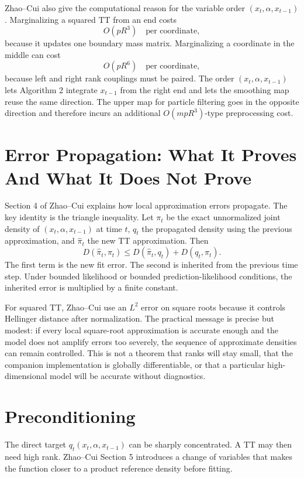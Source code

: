 \documentclass[11pt]{article}
\begin{document}
Zhao--Cui also give the computational reason for the variable order
\((x_t,\alpha,x_{t-1})\).  Marginalizing a squared TT from an end costs
\[
    O(pR^3)\quad\text{per coordinate},
    \tag{B8}
\]
because it updates one boundary mass matrix.  Marginalizing a coordinate in the
middle can cost
\[
    O(pR^6)\quad\text{per coordinate},
    \tag{B9}
\]
because left and right rank couplings must be paired.  The order
\((x_t,\alpha,x_{t-1})\) lets Algorithm 2 integrate \(x_{t-1}\) from the right
end and lets the smoothing map reuse the same direction.  The upper map for
particle filtering goes in the opposite direction and therefore incurs an
additional \(O(mpR^3)\)-type preprocessing cost.

\section{Error Propagation: What It Proves And What It Does Not Prove}

Section 4 of Zhao--Cui explains how local approximation errors propagate.  The
key identity is the triangle inequality.  Let \(\pi_t\) be the exact
unnormalized joint density of \((x_t,\alpha,x_{t-1})\) at time \(t\), \(q_t\)
the propagated density using the previous approximation, and
\(\widehat\pi_t\) the new TT approximation.  Then
\[
    D(\widehat\pi_t,\pi_t)
    \le
    D(\widehat\pi_t,q_t)+D(q_t,\pi_t).
    \tag{E1}
\]
The first term is the new fit error.  The second is inherited from the previous
time step.  Under bounded likelihood or bounded prediction-likelihood
conditions, the inherited error is multiplied by a finite constant.

For squared TT, Zhao--Cui use an \(L^2\) error on square roots because it
controls Hellinger distance after normalization.  The practical message is
precise but modest: if every local square-root approximation is accurate enough
and the model does not amplify errors too severely, the sequence of approximate
densities can remain controlled.  This is not a theorem that ranks will stay
small, that the companion implementation is globally differentiable, or that a
particular high-dimensional model will be accurate without diagnostics.

\section{Preconditioning}

The direct target \(q_t(x_t,\alpha,x_{t-1})\) can be sharply concentrated.  A TT
may then need high rank.  Zhao--Cui Section 5 introduces a change of variables
that makes the function closer to a product reference density before fitting.
\end{document}
